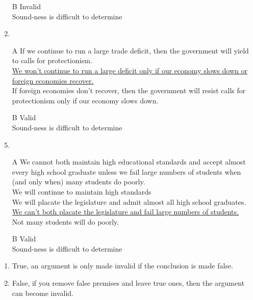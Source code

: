 \documentclass{article}
\begin{document}
\begin{enumerate}
\item[B]
Invalid
\\Sound-ness is difficult to determine
\item
\item[A]
If we continue to run a large trade deficit, then the government will yield to calls for protectionism.
\\\underline{We won't continue to run a large deficit only if our economy slows down or foreign economies recover.}
\\If foreign economies don't recover, then the government will resist calls for protectionism only if our economy slows down. 
\item[B]
Valid
\\Sound-ness is difficult to determine
\item
\item[A]
We cannot both maintain high educational standards and accept almost every high school graduate unless we fail large numbers of students when (and only when) many students do poorly.
\\We will continue to maintain high standards
\\We will placate the legislature and admit almost all high school graduates.
\\\underline{We can't both placate the legislature and fail large numbers of students.}
\\Not many students will do poorly.
\item[B]
Valid
\\Sound-ness is difficult to determine
\end{enumerate}
\begin{enumerate}
\item
True, an argument is only made invalid if the conclusion is made false.
\item
False, if you remove false premises and leave true ones, then the argument can become invalid.
\end{enumerate}
\end{document}
